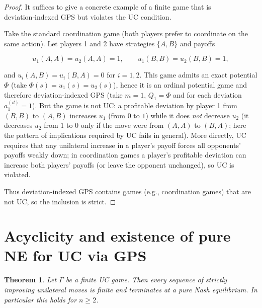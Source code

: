 \documentclass[11pt]{article}
\newtheorem{theorem}{Theorem}[section]
\begin{document}
\begin{proof}
It suffices to give a concrete example of a finite game that is deviation‑indexed GPS but violates the UC condition.

Take the standard  coordination game (both players prefer to coordinate on the same action). Let players 1 and 2 have strategies $\{A,B\}$ and payoffs


\[
u_1(A,A)=u_2(A,A)=1,\qquad u_1(B,B)=u_2(B,B)=1,
\]


and $u_i(A,B)=u_i(B,A)=0$ for $i=1,2$. This game admits an exact potential $\Phi$ (take $\Phi(s)=u_1(s)=u_2(s)$), hence it is an ordinal potential game and therefore deviation‑indexed GPS (take $m=1$, $Q_1=\Phi$ and for each deviation $a^{(d)}_1=1$). But the game is not UC: a profitable deviation by player 1 from $(B,B)$ to $(A,B)$ increases $u_1$ (from $0$ to $1$) while it does \emph{not} decrease $u_2$ (it decreases $u_2$ from $1$ to $0$ only if the move were from $(A,A)$ to $(B,A)$; here the pattern of implications required by UC fails in general). More directly, UC requires that any unilateral increase in a player's payoff forces all opponents' payoffs weakly down; in coordination games a player's profitable deviation can increase both players' payoffs (or leave the opponent unchanged), so UC is violated.

Thus deviation‑indexed GPS contains games (e.g., coordination games) that are not UC, so the inclusion is strict.
\end{proof}

\section{Acyclicity and existence of pure NE for UC via GPS}

\begin{theorem}\label{thm:UC-NE}
Let $\Gamma$ be a finite UC game. Then every sequence of strictly improving unilateral moves is finite and terminates at a pure Nash equilibrium. In particular this holds for $n\ge2$.
\end{theorem}
\end{document}

